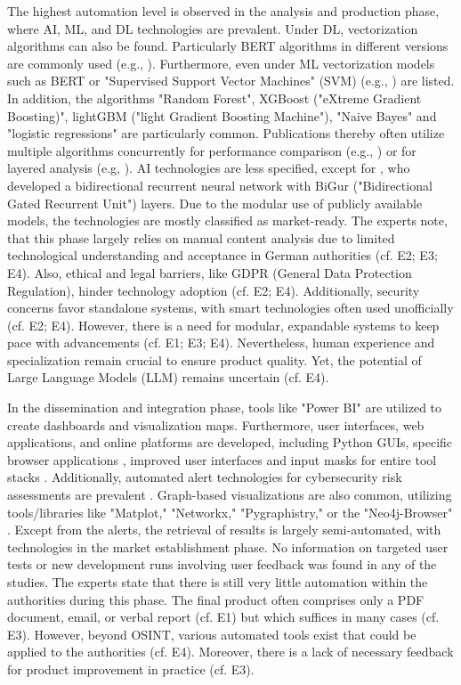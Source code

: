 \documentclass[10pt]{article}
\begin{document}
The highest automation level is observed in the analysis and production phase, where AI, ML, and DL technologies are prevalent.
Under DL, vectorization algorithms can also be found. Particularly BERT algorithms in different versions are commonly used
(e.g., \cite{Ma.2022}). Furthermore, even under ML vectorization models such as BERT or
"Supervised Support Vector Machines" (SVM) (e.g., \cite{Iorga.2020}) are listed.
In addition, the algorithms "Random Forest", XGBoost ("eXtreme Gradient Boosting)",
lightGBM ("light Gradient Boosting Machine"), "Naive Bayes" and "logistic regressions" are particularly common.
Publications thereby often utilize multiple algorithms concurrently for performance comparison (e.g., \cite{Tao.2023})
or for layered analysis (e.g, \cite{Yang.2022}). AI technologies are less specified,
except for \cite{Dale.2023}, who developed a bidirectional recurrent neural network with
BiGur ("Bidirectional Gated Recurrent Unit") layers. Due to the modular use of publicly available models,
the technologies are mostly classified as market-ready. The experts note, that this phase largely relies
on manual content analysis due to limited technological understanding and acceptance in German authorities
(cf. E2; E3; E4). Also, ethical and legal barriers, like GDPR (General Data Protection Regulation), hinder technology
adoption (cf. E2; E4). Additionally, security concerns favor standalone systems,
with smart technologies often used unofficially (cf. E2; E4). However, there is a need for modular,
expandable systems to keep pace with advancements (cf. E1; E3; E4). Nevertheless, human experience
and specialization remain crucial to ensure product quality. Yet, the potential of Large Language Models (LLM) remains uncertain (cf. E4).

In the dissemination and integration phase, tools like "Power BI" \cite{Tao.2023}
are utilized to create dashboards and visualization maps. Furthermore, user interfaces,
web applications, and online platforms are developed, including Python GUIs,
specific browser applications \cite{Elmas.2022},
improved user interfaces and input masks for entire tool stacks \cite{Arjun.2020}.
Additionally, automated alert technologies for cybersecurity risk assessments are prevalent \cite{Ahuja.2022}. Graph-based visualizations are also common, utilizing tools/libraries like "Matplot," "Networkx," "Pygraphistry," or the "Neo4j-Browser" \cite{Middleton.2020}.
Except from the alerts, the retrieval of results is largely semi-automated, with technologies in the market establishment phase. No information on targeted user tests or new development runs involving user feedback was found in any of the studies. The experts state that there is still very little
automation within the authorities during this phase. The final product often comprises only a PDF document, email, or verbal report (cf. E1) but which suffices in many cases (cf. E3).
However, beyond OSINT, various automated tools exist that could be applied to the authorities (cf. E4). Moreover, there is a lack of necessary feedback for product improvement in practice (cf. E3).
\end{document}
